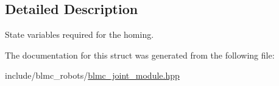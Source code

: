 \subsection{Detailed Description}
State variables required for the homing. 

The documentation for this struct was generated from the following file\+:\begin{DoxyCompactItemize}
\item 
include/blmc\+\_\+robots/\hyperlink{blmc__joint__module_8hpp}{blmc\+\_\+joint\+\_\+module.\+hpp}\end{DoxyCompactItemize}
